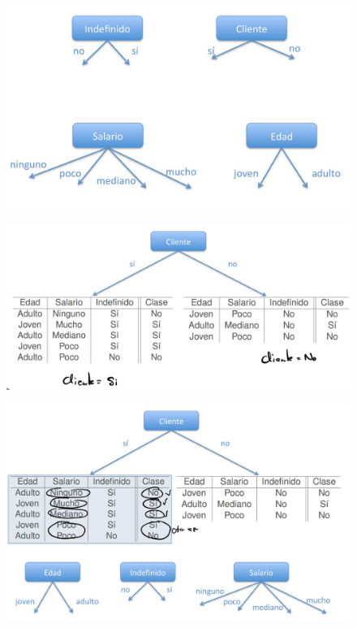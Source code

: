 \documentclass[12pt, twoside, openright]{report} %
\begin{document}
\begin{figure}[H]
	{\includegraphics[scale=.2]{Untitled 4.png}}

\end{figure}
\begin{figure}[H]
	{\includegraphics[scale=.2]{Untitled 5.png}}
\end{figure}
\begin{figure}[H]
	{\includegraphics[scale=.2]{Untitled 6.png}}
\end{figure}
\end{document}
